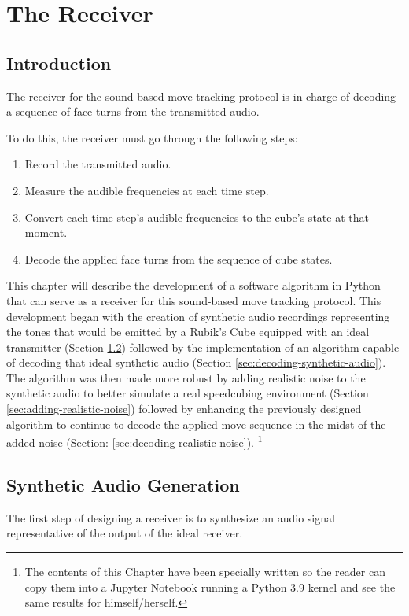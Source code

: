 
\chapter{The Receiver} %

\label{Chapter5}

\section{Introduction}
The receiver for the sound-based move tracking protocol is in charge of decoding a sequence of face turns from the transmitted audio.

To do this, the receiver must go through the following steps:
\begin{enumerate}
    \item Record the transmitted audio.
    \item Measure the audible frequencies at each time step.
    \item Convert each time step's audible frequencies to the cube's state at that moment.
    \item Decode the applied face turns from the sequence of cube states.
\end{enumerate}

This chapter will describe the development of a software algorithm in Python that can serve as a receiver for this sound-based move tracking protocol. 
This development began with the creation of synthetic audio recordings representing the tones that would be emitted by a Rubik's Cube equipped with an ideal transmitter (Section \ref{sec:synthetic-audio-generation}) followed by the implementation of an algorithm capable of decoding that ideal synthetic audio (Section \ref{sec:decoding-synthetic-audio}).
The algorithm was then made more robust by adding realistic noise to the synthetic audio to better simulate a real speedcubing environment (Section \ref{sec:adding-realistic-noise}) followed by enhancing the previously designed algorithm to continue to decode the applied move sequence in the midst of the added noise (Section: \ref{sec:decoding-realistic-noise}). \footnote{The contents of this Chapter have been specially written so the reader can copy them into a Jupyter Notebook running a Python 3.9 kernel and see the same results for himself/herself.} 


\section{Synthetic Audio Generation}
\label{sec:synthetic-audio-generation}
The first step of designing a receiver is to synthesize an audio signal representative of the output of the ideal receiver.

